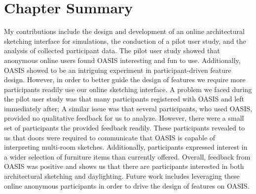 
\section{ Chapter Summary }


My contributions include the design and development of an online architectural sketching interface for simulations, the conduction of a pilot user study, and the analysis of collected participant data.  The pilot user study showed that anonymous online users found OASIS interesting and fun to use.  Additionally, OASIS showed to be an intriguing experiment in participant-driven feature design.  However, in order to better guide the design of features we require more participants readily use our online sketching interface. A problem we faced during the pilot user study was that many participants registered with OASIS and left immediately after; A similar issue was that several participants, who used OASIS, provided no qualitative feedback for us to analyze.  However, there were a small set of participants the provided feedback readily.  These participants revealed to us that doors were required to communicate that OASIS is capable of interpreting multi-room sketches. Additionally, participants expressed interest in a wider selection of furniture items than currently offered.  Overall, feedback from OASIS was positive and shows us that there are participants interested in both architectural sketching and daylighting. Future work includes leveraging these online anonymous participants in order to drive the design of features on OASIS.  \\ 






